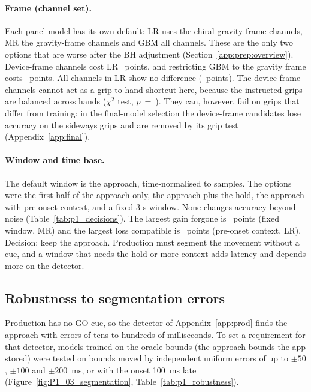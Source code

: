 \paragraph{Frame (channel set).} Each panel model has its own default: LR uses the
 chiral gravity-frame channels, MR the  gravity-frame channels and
GBM all  channels. These are the only two options that are worse after the BH
adjustment (Section~\ref{app:prep:overview}). Device-frame channels cost LR
~points, and restricting GBM to the gravity frame costs
~points. All  channels in LR show no difference
(~points). The device-frame channels cannot act as a grip-to-hand shortcut here,
because the instructed grips are balanced across hands ($\chi^2$ test, $p$~=~). They can,
however, fail on grips that differ from training: in the final-model selection the device-frame candidates
lose accuracy on the sideways grips and are removed by its grip test (Appendix~\ref{app:final}).

\paragraph{Window and time base.} The default window is the approach, time-normalised to
 samples. The options were the first half of the approach only, the approach plus the hold,
the approach with pre-onset context, and a fixed 3-s window. None changes accuracy beyond noise
(Table~\ref{tab:p1_decisions}). The largest gain forgone is ~points (fixed
window, MR) and the largest loss compatible is ~points (pre-onset context, LR).
Decision: keep the approach. Production must segment the movement without a cue, and a window that needs
the hold or more context adds latency and depends more on the detector.

\subsection{Robustness to segmentation errors}\label{app:prep:segmentation}

Production has no GO cue, so the detector of Appendix~\ref{app:prod} finds the approach with errors of tens
to hundreds of milliseconds. To set a requirement for that detector, models trained on the oracle bounds
(the approach bounds the app stored) were tested on bounds moved by independent uniform errors of up to
$\pm 50$, $\pm 100$ and $\pm 200$~ms, or with the onset 100~ms late (Figure~\ref{fig:P1_03_segmentation},
Table~\ref{tab:p1_robustness}).

